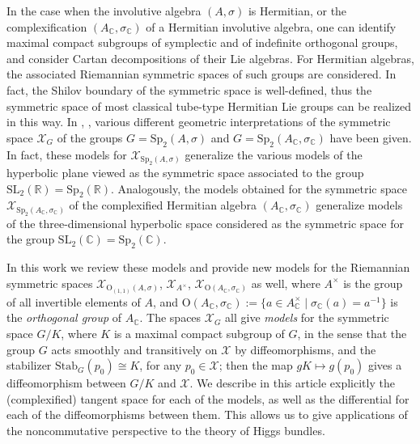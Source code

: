 \documentclass[oneside,11pt]{amsart}
\theoremstyle{definition}
\theoremstyle{remark}
\numberwithin{thm}{section}
\numberwithin{equation}{section}
\begin{document}
In the case when the involutive algebra $(A, \sigma)$ is Hermitian, or the complexification $(A_{\mathbb{C}}, \sigma_{\mathbb{C}})$ of a Hermitian involutive algebra, one can identify maximal compact subgroups of symplectic and of indefinite orthogonal groups, and consider Cartan decompositions of their Lie algebras. For Hermitian algebras, the associated Riemannian symmetric spaces of such groups are considered. In fact, the Shilov boundary of the symmetric space is well-defined, thus the symmetric space of most classical tube-type Hermitian Lie groups can be realized in this way. In \cite{ABRRW}, \cite{Rog},  various different geometric interpretations of the symmetric space $\mathcal{X}_{G}$ of the groups $G=\mathrm{Sp}_{2}(A,\sigma )$ and  $G=\mathrm{Sp}_2(A_{\mathbb{C}}, \sigma_{\mathbb{C}})$ have been given. 
In fact, these models for $\mathcal{X}_{\mathrm{Sp}_{2}(A,\sigma)}$ generalize the various models of the hyperbolic plane viewed as the symmetric space associated to the group $\mathrm{SL}_2( \mathbb{R})=\mathrm{Sp}_2( \mathbb{R})$. Analogously, the models obtained for the symmetric space  $\mathcal{X}_{\mathrm{Sp}_{2}(A_{\mathbb{C}},\sigma_{\mathbb{C}} )}$ of the complexified Hermitian algebra $(A_{\mathbb{C}},\sigma_{\mathbb{C}})$ generalize models of the three-dimensional hyperbolic space considered as the symmetric space for the group $\mathrm{SL}_2( \mathbb{C})=\mathrm{Sp}_2( \mathbb{C})$. 


In this work we review these models and provide new models for the Riemannian symmetric spaces $\mathcal{X}_{\mathrm{O}_{(1,1)}(A,\sigma )}$, $\mathcal{X}_{A^{\times}}$, $\mathcal{X}_{\mathrm{O}(A_{\mathbb{C}},\sigma_{\mathbb{C}} )}$  as well, where $A^{\times}$ is the group of all invertible elements of $A$, and $\mathrm{O}(A_{\mathbb{C}},\sigma_{\mathbb{C}}):=\{ a\in A_{\mathbb{C}}^{\times}\mid \sigma_{\mathbb{C}}(a)=a^{-1}\}$ is the \emph{orthogonal group} of $A_{\mathbb{C}}$. The spaces $\mathcal{X}_G$ all give  \emph{models} for the symmetric space $G/K$, where $K$ is a maximal compact subgroup of $G$, in the sense that the group $G$ acts smoothly and transitively on $\mathcal{X}$ by diffeomorphisms, and the stabilizer $\mathrm{Stab}_{G}(p_0) \cong K$, for any $p_0 \in \mathcal{X}$; then the map $gK \mapsto g(p_0)$ gives a diffeomorphism between $G/K$ and $\mathcal{X}$. 
We describe in this article explicitly the (complexified) tangent space for each of the models, as well as the differential for each of the diffeomorphisms between them. This allows us to give applications of the noncommutative perspective to the theory of Higgs bundles. 
\end{document}
